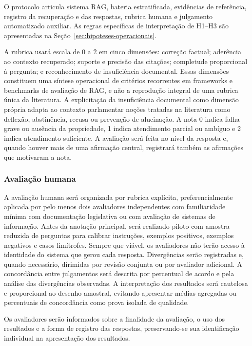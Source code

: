 O protocolo articula sistema RAG, bateria estratificada, evidências de referência, registro da recuperação e das respostas, rubrica humana e julgamento automatizado auxiliar. As regras específicas de interpretação de H1--H3 são apresentadas na Seção~\ref{sec:hipoteses-operacionais}.

A rubrica usará escala de 0 a 2 em cinco dimensões: correção factual; aderência ao contexto recuperado; suporte e precisão das citações; completude proporcional à pergunta; e reconhecimento de insuficiência documental. Essas dimensões constituem uma síntese operacional de critérios recorrentes em frameworks e benchmarks de avaliação de RAG, e não a reprodução integral de uma rubrica única da literatura. A explicitação da insuficiência documental como dimensão própria adapta ao contexto parlamentar noções tratadas na literatura como deflexão, abstinência, recusa ou prevenção de alucinação. A nota 0 indica falha grave ou ausência da propriedade, 1 indica atendimento parcial ou ambíguo e 2 indica atendimento suficiente. A avaliação será feita no nível da resposta e, quando houver mais de uma afirmação central, registrará também as afirmações que motivaram a nota.

\subsubsection{Avaliação humana}

A avaliação humana será organizada por rubrica explícita, preferencialmente aplicada por pelo menos dois avaliadores independentes com familiaridade mínima com documentação legislativa ou com avaliação de sistemas de informação. Antes da anotação principal, será realizado piloto com amostra reduzida de perguntas para calibrar instruções, exemplos positivos, exemplos negativos e casos limítrofes. Sempre que viável, os avaliadores não terão acesso à identidade do sistema que gerou cada resposta. Divergências serão registradas e, quando necessário, dirimidas por revisão conjunta ou por avaliador adicional. A concordância entre julgamentos será descrita por percentual de acordo e pela análise das divergências observadas. A interpretação dos resultados será cautelosa e proporcional ao desenho amostral, evitando apresentar médias agregadas ou percentuais de concordância como prova isolada de qualidade.

Os avaliadores serão informados sobre a finalidade da avaliação, o uso dos resultados e a forma de registro das respostas, preservando-se sua identificação individual na apresentação dos resultados.

